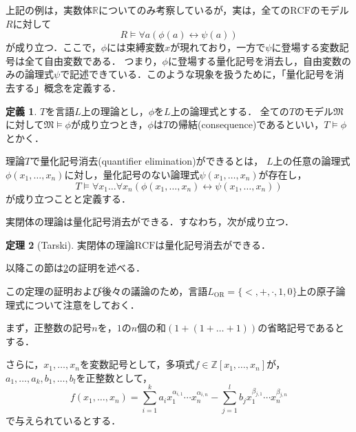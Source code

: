 \documentclass[uplatex, dvipdfmx]{jsarticle}
\numberwithin{equation}{section}
\newcommand{\R}{\mathbb{R}}
\newcommand{\Z}{\mathbb{Z}}
\newcommand{\M}{\mathfrak{M}}
\newcommand{\RCF}{\mathrm{RCF}}
\theoremstyle{definition}
\newtheorem{definition}{定義}[section]
\newtheorem{theorem}[definition]{定理}
\begin{document}
上記の例は，実数体$\R$についてのみ考察しているが，実は，全ての$\RCF$のモデル$R$に対して
\begin{equation}
     R \models \forall a (\phi(a) \leftrightarrow \psi(a))
\end{equation}
が成り立つ．ここで，$\phi$には束縛変数$x$が現れており，一方で$\psi$に登場する変数記号は全て自由変数である．
つまり，$\phi$に登場する量化記号を消去し，自由変数のみの論理式$\psi$で記述できている．このような現象を扱うために，「量化記号を消去する」概念を定義する．


\begin{definition}
$T$を言語$L$上の理論とし，$\phi$を$L$上の論理式とする．
全ての$T$のモデル$\M$に対して$\M \models \phi$が成り立つとき，$\phi$は$T$の帰結(consequence)であるといい，$T \models \phi$とかく．

理論$T$で量化記号消去(quantifier elimination)ができるとは，
$L$上の任意の論理式$\phi(x_1,\dots,x_n)$に対し，量化記号のない論理式$\psi(x_1,\dots, x_n)$が存在し，
\begin{equation}
     T \models \forall x_1 \dots \forall x_n(\phi(x_1,\dots,x_n) \leftrightarrow \psi(x_1, \dots, x_n))
\end{equation}
が成り立つことと定義する．
\end{definition}


実閉体の理論は量化記号消去ができる．すなわち，次が成り立つ．

\begin{theorem}[Tarski]\label{theorem:Tarski}
     実閉体の理論$\RCF$は量化記号消去ができる．
\end{theorem}

以降この節は\cref{theorem:Tarski}の証明を述べる．

この定理の証明および後々の議論のため，言語$L_\mathrm{OR} = \{<, +, \cdot, 1, 0\}$上の原子論理式について注意をしておく．

まず，正整数の記号$n$を，$1$の$n$個の和$(1 + (1 + \dots + 1 ))$の省略記号であるとする．

さらに，$x_1, \dots, x_n$を変数記号として，多項式$f \in \Z[x_1, \dots, x_n]$が，$a_1, \dots, a_k, b_1, \dots, b_l$を正整数として，
\begin{equation}
     f(x_1, \dots, x_n) = \sum_{i=1}^k a_i x_1^{\alpha_{i,1}} \cdots x_n^{\alpha_{i,n}} - \sum_{j=1}^l b_j x_1^{\beta_{j,1}} \cdots x_n^{\beta_{j,n}}
\end{equation}
で与えられているとする．
\end{document}
